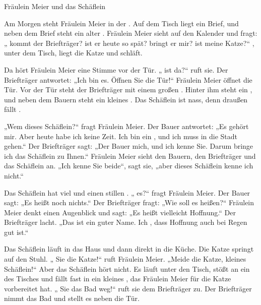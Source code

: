 \documentclass[12pt]{nextbook}
\begin{document}
\begin{readersection}{Fräulein Meier und das Schäflein}

Am Morgen steht Fräulein Meier in der . Auf dem Tisch liegt ein Brief, und neben dem Brief steht ein alter . Fräulein Meier sieht auf den Kalender und fragt: „ kommt der Briefträger?  ist er heute so spät?  bringt er mir?  ist meine Katze?“ , unter dem Tisch, liegt die Katze und schläft.

Da hört Fräulein Meier eine Stimme vor der Tür. „ ist da?“ ruft sie. Der Briefträger antwortet: „Ich bin es. Öffnen Sie die Tür!“ Fräulein Meier öffnet die Tür. Vor der Tür steht der Briefträger mit einem großen . Hinter ihm steht ein , und neben dem Bauern steht ein kleines . Das Schäflein ist nass, denn draußen fällt .

„Wem  dieses Schäflein?“ fragt Fräulein Meier. Der Bauer antwortet: „Es gehört mir. Aber heute habe ich keine Zeit. Ich bin ein , und ich muss in die Stadt gehen.“ Der Briefträger sagt: „Der Bauer  mich, und ich kenne Sie. Darum bringe ich das Schäflein zu Ihnen.“ Fräulein Meier sieht den Bauern, den Briefträger und das Schäflein an. „Ich kenne Sie beide“, sagt sie, „aber dieses Schäflein kenne ich nicht.“

Das Schäflein hat viel  und einen stillen . „  es?“ fragt Fräulein Meier. Der Bauer sagt: „Es heißt noch nichts.“ Der Briefträger fragt: „Wie soll es heißen?“ Fräulein Meier denkt einen Augenblick und sagt: „Es heißt vielleicht Hoffnung.“ Der Briefträger lacht. „Das ist ein guter Name. Ich , dass Hoffnung auch bei Regen gut ist.“

Das Schäflein läuft in das Haus und dann direkt in die Küche. Die Katze springt auf den Stuhl. „ Sie die Katze!“ ruft Fräulein Meier. „Meide die Katze, kleines Schäflein!“ Aber das Schäflein hört nicht. Es läuft unter den Tisch, stößt an ein  des Tisches und fällt fast in ein kleines , das Fräulein Meier für die Katze vorbereitet hat. „ Sie das Bad weg!“ ruft sie dem Briefträger zu. Der Briefträger nimmt das Bad und stellt es neben die Tür.


\end{readersection}
\end{document}
